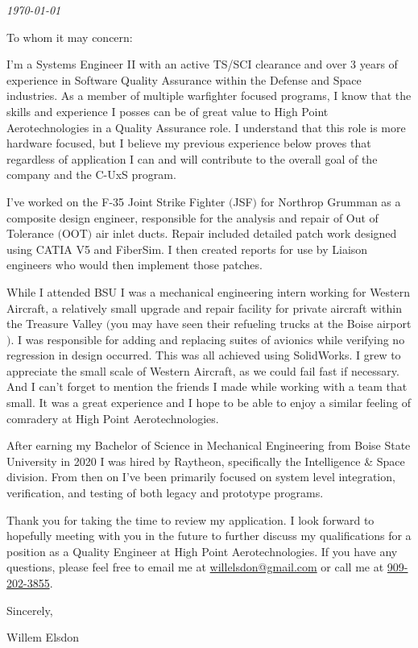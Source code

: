 \documentclass{ExpressiveCoverLetter}
\begin{document}
\coverletterheader[
    firstname=Willem,
    middleinitial=N,
    lastname=Elsdon,
    email=willelsdon@gmail.com,
    phone=909-202-3855,
    linkedin=willem-elsdon,
    github=welsdon,
    city=Boise,
    state=Idaho
]

\vspace{0.05in}
\emph{\today}
\vspace{0.15in}


To whom it may concern:

I'm a Systems Engineer II with an active TS/SCI clearance and over 3 years of experience in Software
Quality Assurance within the Defense and Space industries. As a member
of multiple warfighter focused programs, I know that
the skills and experience I posses can be of great value to High Point
Aerotechnologies in a Quality Assurance role. I understand that this
role is more hardware focused, but I believe my previous experience
below proves that regardless of application I can and will contribute to
the overall goal of the company and the C-UxS program.

I've worked on the F-35 Joint Strike Fighter $($JSF$)$ for Northrop
Grumman as a composite design engineer, responsible for the analysis and
repair of
Out of Tolerance $($OOT$)$ air inlet ducts. Repair included detailed
patch work designed using CATIA V5 and FiberSim. I then created reports
for use by Liaison engineers who would then implement those patches.

While I attended BSU I was a mechanical engineering intern working for
Western Aircraft, a relatively small upgrade and repair facility for
private aircraft within the Treasure Valley $($you may have seen their
refueling trucks at the Boise airport$)$. I was responsible for
adding and replacing suites of avionics while verifying no regression in
design occurred. This was all achieved using SolidWorks. I grew to
appreciate the small scale of Western Aircraft, as we could fail fast if necessary.
And I can't forget to mention the friends I made while working with a team that small.
It was a great experience and I hope to be able to enjoy a similar
feeling of comradery at High Point Aerotechnologies.

After earning my Bachelor of Science in Mechanical Engineering from
Boise State University in 2020 I was hired by Raytheon, specifically the
Intelligence \& Space division. From then on I've been primarily focused
on system level integration, verification, and testing of both legacy
and prototype programs.

Thank you for taking the time to review my application. I look forward
to hopefully meeting with you in the future to further discuss my
qualifications for a position as a Quality Engineer at High Point Aerotechnologies.
If you have any questions, please feel free to
email me at \href{mailto:willelsdon@gmail.com}{willelsdon@gmail.com} or
call me at \href{tel:+1-909-202-3855}{909-202-3855}.

Sincerely,

\vspace{0.15in}

Willem Elsdon
\end{document}
